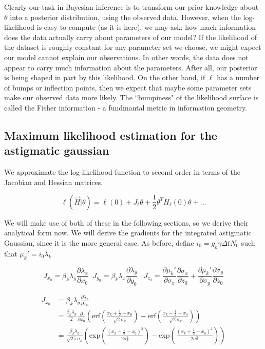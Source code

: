 \documentclass{ucetd}
\begin{document}
Clearly our task in Bayesian inference is to transform our prior knowledge about $\theta$ into a posterior distribution, using the observed data. However, when the log-likelihood is easy to compute (as it is here), we may ask: how much information does the data actually carry about parameters of our model? If the likelihood of the dataset is roughly constant for any parameter set we choose, we might expect our model cannot explain our observations. In other words, the data does not appear to carry much information about the parameters. After all, our posterior is being shaped in part by this likelihood. On the other hand, if $\ell$ has a number of bumps or inflection points, then we expect that maybe some parameter sets make our observed data more likely. The ``bumpiness" of the likelihood surface is called the Fisher information - a fundmantal metric in information geometry. 

\subsection{Maximum likelihood estimation for the astigmatic gaussian}

We approximate the log-likelihood function to second order in terms of the Jacobian and Hessian matrices. 

\begin{equation*}
\ell(\vec{H}|\theta) = \ell(0) + J_{\ell}\theta + \frac{1}{2}\theta^{T}H_{\ell}(0)\theta + ...
\end{equation*}

We will make use of both of these in the following sections, so we derive their analytical form now. We will derive the gradients for the integrated astigmatic Gaussian, since it is the more general case. As before, define $i_{0} = g_{k}\gamma\Delta t N_{0}$ such that $\mu_{k}' = i_{0}\lambda_{k}$

\begin{equation*}
J_{x_{0}} = \beta_{k}\lambda_{y}\frac{\partial \lambda_{x}}{\partial x_{0}} \;\; J_{y_{0}} = \beta_{k}\lambda_{x}\frac{\partial \lambda_{y}}{\partial y_{0}}\;\;\; J_{z_{0}}  = \frac{\partial \mu_{k}'}{\partial \sigma_{x}}\frac{\partial \sigma_{x}}{\partial z_{0}} + \frac{\partial \mu_{k}'}{\partial \sigma_{y}}\frac{\partial \sigma_{y}}{\partial z_{0}}
\end{equation*}

\begin{align*}
J_{x_{0}} &= \beta_{k}\lambda_{y}\frac{\partial \lambda_{x}}{\partial x_{0}} \\
&= \frac{\beta_{k}\lambda_{y}}{2}\frac{\partial}{\partial x_{0}}\left(\mathrm{erf}\left(\frac{x_{k}+\frac{1}{2}-x_{0}}{\sqrt{2}\sigma_{x}}\right) -\mathrm{erf}\left(\frac{x_{k}-\frac{1}{2}-x_{0}}{\sqrt{2}\sigma_{x}}\right)\right)\\
&= \frac{\beta_{k}\lambda_{y}}{\sqrt{2\pi}\sigma_{x}}\left(\mathrm{exp}\left(\frac{(x_{k}-\frac{1}{2}-x_{0})^{2}}{2\sigma_{x}^{2}}\right) -\mathrm{exp}\left(\frac{(x_{k}+\frac{1}{2}-x_{0})^{2}}{2\sigma_{x}^{2}}\right)\right)
\end{align*}
\end{document}
